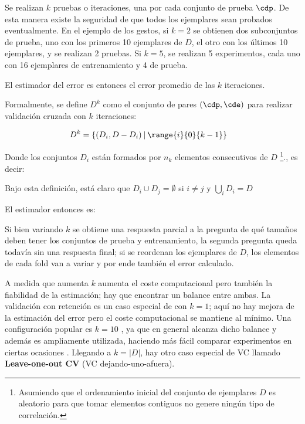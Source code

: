 Se realizan $k$ pruebas o iteraciones, una por cada conjunto de prueba $\cdp$. De esta manera existe la seguridad de que todos los ejemplares sean probados eventualmente. En el ejemplo de los gestos, si $k=2$ se obtienen dos subconjuntos de prueba, uno con los primeros 10 ejemplares de $D$, el otro con los últimos 10 ejemplares, y se realizan 2 pruebas. Si $k=5$, se realizan 5 experimentos, cada uno con 16 ejemplares de entrenamiento y 4 de prueba. 


El estimador del error es entonces el error promedio de las $k$ iteraciones.

Formalmente, se define $D^k$ como el conjunto de pares $(\cdp,\cde)$ para realizar validación cruzada con $k$ iteraciones:

\begin{align}
D^k &= \{ (D_i,D-D_i) \hspace{0.2em} | \hspace{0.2em}  \range{i}{0}{k-1}  \}
\end{align}

Donde los conjuntos $D_i$ están formados por $n_k$ elementos consecutivos de $D$ \footnote{Asumiendo que el ordenamiento inicial del conjunto de ejemplares $D$ es aleatorio para que tomar elementos contiguos no genere ningún tipo de correlación.}., es decir:


Bajo esta definición, está claro que $D_i \cup D_j = \emptyset $ si $i\neq j$ y $\bigcup_i D_i = D$ 

El estimador entonces es:

Si bien variando $k$ se obtiene una respuesta parcial a la pregunta de qué tamaños deben tener los conjuntos de prueba y entrenamiento, la segunda pregunta queda todavía sin una respuesta final; si se reordenan los ejemplares de $D$, los elementos de cada fold van a variar y por ende también el error calculado.

A medida que aumenta $k$ aumenta el coste computacional pero también la fiabilidad de la estimación; hay que encontrar un balance entre ambas. La validación con retención es un caso especial de \kvc con $k=1$; aquí no hay mejora de la estimación del error pero el coste computacional se mantiene al mínimo. Una configuración popular es $k=10$ \cite{refaeilzadeh2009,dietterich1998}, ya que en general alcanza dicho balance y además es ampliamente utilizada, haciendo más fácil comparar experimentos en ciertas ocasiones . Llegando a $k=|D|$, hay otro caso especial de VC llamado \textbf{Leave-one-out CV} (VC dejando-uno-afuera).

